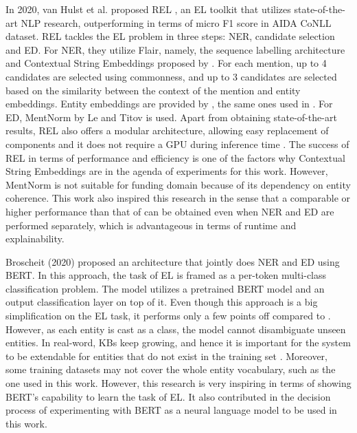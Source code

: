 \documentclass{report}
\theoremstyle{definition}
\theoremstyle{remark}
\begin{document}
In 2020, van Hulst et al. proposed REL \cite{REL}, an EL toolkit that utilizes state-of-the-art NLP research, outperforming \cite{kolitsas} in terms of micro F1 score in AIDA CoNLL dataset. REL tackles the EL problem in three steps: NER, candidate selection and ED. For NER, they utilize Flair, namely, the sequence labelling architecture and Contextual String Embeddings proposed by \cite{flairpaper}. For each mention, up to 4 candidates are selected using commonness, and up to 3 candidates are selected based on the similarity between the context of the mention and entity embeddings. Entity embeddings are provided by \cite{kolitsasEmbed}, the same ones used in \cite{kolitsas}. For ED, MentNorm by Le and Titov \cite{mentnorm} is used. Apart from obtaining state-of-the-art results, REL also offers a modular architecture, allowing easy replacement of components and it does not require a GPU during inference time \cite{REL}. The success of REL in terms of performance and efficiency is one of the factors why Contextual String Embeddings are in the agenda of experiments for this work. However, MentNorm is not suitable for funding domain because of its dependency on entity coherence. This work also inspired this research in the sense that a comparable or higher performance than that of \cite{kolitsas} can be obtained even when NER and ED are performed separately, which is advantageous in terms of runtime and explainability.

Broscheit (2020) \cite{bertEL} proposed an architecture that jointly does NER and ED using BERT. In this approach, the task of EL is framed as a per-token multi-class classification problem. The model utilizes a pretrained BERT model and an output classification layer on top of it. Even though this approach is a big simplification on the EL task, it performs only a few points off compared to \cite{kolitsas}.  However, as each entity is cast as a class, the model cannot disambiguate unseen entities. In real-word, KBs keep growing, and hence it is important for the system to be extendable for entities that do not exist in the training set \cite{gupta}. Moreover, some training datasets may not cover the whole entity vocabulary, such as the one used in this work. However, this research is very inspiring in terms of showing BERT's capability to learn the task of EL. It also contributed in the decision process of experimenting with BERT as a neural language model to be used in this work.
\end{document}
